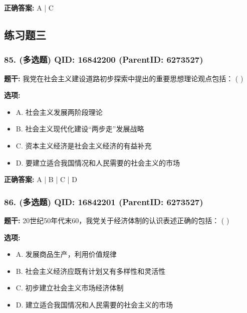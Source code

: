 \documentclass[12pt,UTF8]{ctexart}
\begin{document}
\textbf{正确答案:}
A | C

\vspace{0.3em}\hrulefill\vspace{0.7em}

\subsection*{练习题三}

\subsubsection*{85. (多选题) \small QID: 16842200 (ParentID: 6273527)}

\textbf{题干:}
我党在社会主义建设道路初步探索中提出的重要思想理论观点包括： ( )



\textbf{选项:}
\begin{itemize}[leftmargin=*]

  \item A. 社会主义发展两阶段理论

  \item B. 社会主义现代化建设“两步走”发展战略

  \item C. 资本主义经济是社会主义经济的有益补充

  \item D. 要建立适合我国情况和人民需要的社会主义的市场

\end{itemize}

\textbf{正确答案:}
A | B | C | D

\vspace{0.3em}\hrulefill\vspace{0.7em}

\subsubsection*{86. (多选题) \small QID: 16842201 (ParentID: 6273527)}

\textbf{题干:}
20世纪50年代末60，我党关于经济体制的认识表述正确的包括： ( )



\textbf{选项:}
\begin{itemize}[leftmargin=*]

  \item A. 发展商品生产，利用价值规律

  \item B. 社会主义经济应既有计划又有多样性和灵活性

  \item C. 初步建立社会主义市场经济体制

  \item D. 建立适合我国情况和人民需要的社会主义的市场

\end{itemize}
\end{document}
